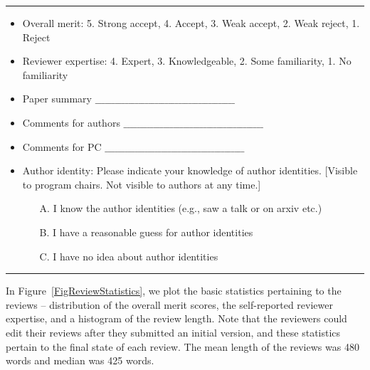 \documentclass{article}
\begin{document}
\noindent\rule{\textwidth}{1pt}
\begin{itemize} 
\item Overall merit: 5. Strong accept, 4. Accept, 3. Weak accept, 2. Weak reject, 1. Reject
\item Reviewer expertise: 4. Expert, 3. Knowledgeable, 2. Some familiarity, 1. No familiarity
\item Paper summary $\_\_\_\_\_\_\_\_\_\_\_\_\_\_\_\_\_\_\_\_\_\_\_\_\_\_\_\_\_\_\_\_\_\_\_\_\_\_\_\_\_\_$
\item Comments for authors $\_\_\_\_\_\_\_\_\_\_\_\_\_\_\_\_\_\_\_\_\_\_\_\_\_\_\_\_\_\_\_\_\_\_\_\_\_\_\_\_\_\_$
\item Comments for PC $\_\_\_\_\_\_\_\_\_\_\_\_\_\_\_\_\_\_\_\_\_\_\_\_\_\_\_\_\_\_\_\_\_\_\_\_\_\_\_\_\_\_$
\item Author identity: Please indicate your knowledge of author identities. [Visible to program chairs. Not visible to authors at any time.]
    \begin{itemize}
        \item[A.] I know the author identities (e.g., saw a talk or on arxiv etc.)
        \item[B.] I have a reasonable guess for author identities
        \item[C.] I have no idea about author identities
    \end{itemize}
\end{itemize}
\noindent\rule{\textwidth}{1pt}

In Figure~\ref{FigReviewStatistics}, we plot the basic statistics pertaining to the reviews -- distribution of the overall merit scores, the self-reported reviewer expertise, and a histogram of the review length. Note that the reviewers could edit their reviews after they submitted an initial version, and these statistics pertain to the final state of each review. The mean length of the reviews was 480 words and median was 425 words. 
\end{document}
